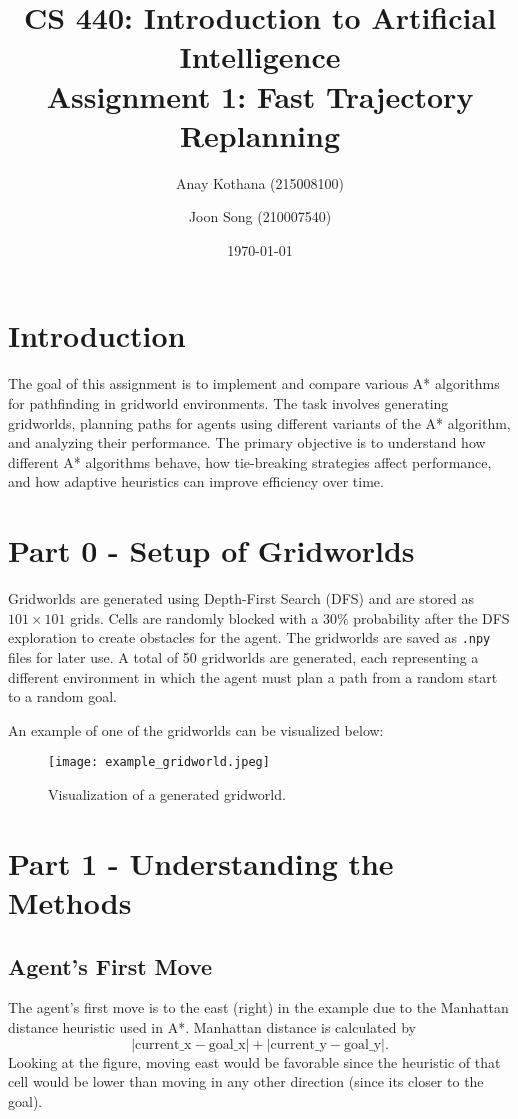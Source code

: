 \documentclass[12pt]{article}
\title{CS 440: Introduction to Artificial Intelligence \\ \textbf{Assignment 1: Fast Trajectory Replanning}}
\author{Anay Kothana (215008100) \and Joon Song (210007540)}
\date{\today}
\begin{document}
\maketitle

\section*{Introduction}
The goal of this assignment is to implement and compare various A* algorithms for pathfinding in gridworld environments. The task involves generating gridworlds, planning paths for agents using different variants of the A* algorithm, and analyzing their performance. The primary objective is to understand how different A* algorithms behave, how tie-breaking strategies affect performance, and how adaptive heuristics can improve efficiency over time.

\section*{Part 0 - Setup of Gridworlds}
Gridworlds are generated using Depth-First Search (DFS) and are stored as $101 \times 101$ grids. Cells are randomly blocked with a 30\% probability after the DFS exploration to create obstacles for the agent. The gridworlds are saved as \texttt{.npy} files for later use. A total of 50 gridworlds are generated, each representing a different environment in which the agent must plan a path from a random start to a random goal.

An example of one of the gridworlds can be visualized below:

\begin{figure}[H]
    \centering
    \texttt{[image: example\_gridworld.jpeg]}
    \caption{Visualization of a generated gridworld.}
    \label{fig:example_gridworld}
\end{figure}

\section*{Part 1 - Understanding the Methods}

\subsection*{Agent's First Move}
The agent's first move is to the east (right) in the example due to the Manhattan distance heuristic used in A*. Manhattan distance is calculated by 
\[
\left| \text{current\_x} - \text{goal\_x} \right| + \left| \text{current\_y} - \text{goal\_y} \right|.
\]
Looking at the figure, moving east would be favorable since the heuristic of that cell would be lower than moving in any other direction (since its closer to the goal). 
\end{document}
